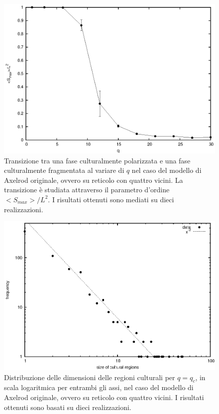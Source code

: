 \documentclass[a4paper,12pt]{article}
\begin{document}
\begin{figure}[!ht]
\begin{center}
\includegraphics[width=\textwidth]{transizione_ret.eps}
\end{center}
\caption{Transizione tra una fase culturalmente polarizzata e una fase culturalmente fragmentata al variare di $q$ nel caso del modello di Axelrod originale, ovvero su reticolo con quattro vicini. La transizione \`{e} studiata attraverso il parametro d'ordine $<S_{max}>/L^2$. I risultati ottenuti sono mediati su dieci realizzazioni.}
\label{transiz_ret}
\end{figure}

\begin{figure}[!ht]
\begin{center}
\includegraphics[width=\textwidth]{cum_distr_size_ret.eps}
\end{center}
\caption{Distribuzione delle dimensioni delle regioni culturali per $q = q_c$, in scala logaritmica per entrambi gli assi, nel caso del modello di Axelrod originale, ovvero su reticolo con quattro vicini. I risultati ottenuti sono basati su dieci realizzazioni.}
\label{cum_distr_size_ret}
\end{figure}
\end{document}
